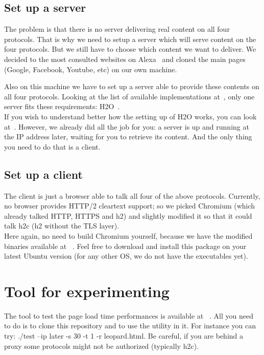 \documentclass[12pt, notitlepage]{article}
\begin{document}
\subsection{Set up a server}

The problem is that there is no server delivering real content on all four
protocols.
That is why we need to setup a server which will serve content on the 
four protocols. But we still have to choose which content we want to 
deliver. We decided to the most consulted websites on Alexa~\cite{alexa} 
and cloned the main pages (Google, Facebook, Youtube, etc) on our own 
machine.

Also on this machine we have to set up a server able to provide these
contents on all four protocols. Looking at the list of available 
implementations at~\cite{implem}, only one server fits these requirements:
H2O~\cite{h2o}.\\

If you wish to understand better how the setting up of H2O works, you
can look at~\cite{h2o}. However, we already did all the job for you: a
server is up and running at the IP address later, waiting for you to
retrieve its content. And the only thing you need to do that is a client.

\subsection{Set up a client}

The client is just a browser able to talk all four of the above 
protocols. Currently, no browser provides HTTP/2 cleartext support; so we
picked Chromium (which already talked HTTP, HTTPS and h2) and
slightly modified it so that it could talk h2c (h2 without the TLS 
layer).\\

Here again, no need to build Chromium yourself, because we have the
modified binaries available at ~\cite{chromium}. Feel free to download and
install this package on your latest Ubuntu version (for any other OS, we 
do not have the executables yet).

\section{Tool for experimenting}

The tool to test the page load time performances is available at
~\cite{load_times}. All you need to do is to clone this repository and
to use the utility in it. For instance you can try: 
./test --ip later -s 30 -t 1 -r leopard.html. Be careful, if you are
behind a proxy some protocols might not be authorized (typically h2c).

\end{document}
